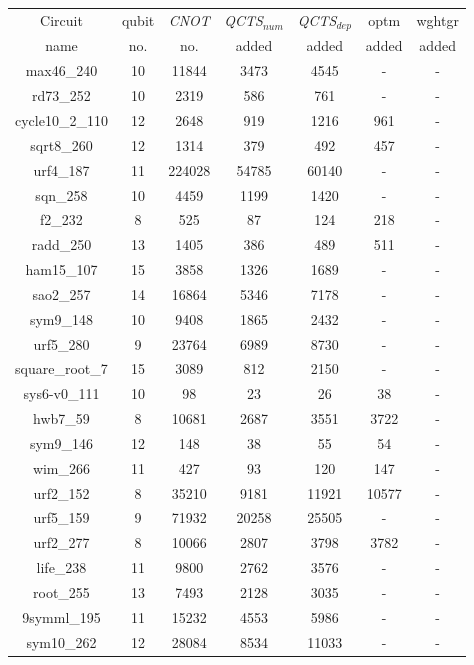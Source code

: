 \documentclass[runningheads]{llncs}
\begin{document}
		\begin{table}[H]
			\label{tab4}
			\begin{center}  
			\begin{tabular}{|c|c|c|c|c|c|c|}
			\hline
			Circuit &  qubit  & \textit{CNOT} &\textit{QCTS$_{num}$}& \textit{QCTS$_{dep}$}  & optm 	 & wghtgr 	\\
			 name	&   no. 	&	no. & added&  added &  added 	&  added\\
			\hline
			max46\_240 & 10 & 11844 & 3473 & 4545 & - & - \\ 
rd73\_252 & 10 & 2319 & 586 & 761 & - & - \\ 
cycle10\_2\_110 & 12 & 2648 & 919 & 1216 & 961 & - \\ 
sqrt8\_260 & 12 & 1314 & 379 & 492 & 457 & - \\ 
urf4\_187 & 11 & 224028 & 54785 & 60140 & - & - \\ 
sqn\_258 & 10 & 4459 & 1199 & 1420 & - & - \\ 
f2\_232 & 8 & 525 & 87 & 124 & 218 & - \\ 
radd\_250 & 13 & 1405 & 386 & 489 & 511 & - \\ 
ham15\_107 & 15 & 3858 & 1326 & 1689 & - & - \\ 
sao2\_257 & 14 & 16864 & 5346 & 7178 & - & - \\ 
sym9\_148 & 10 & 9408 & 1865 & 2432 & - & - \\ 
urf5\_280 & 9 & 23764 & 6989 & 8730 & - & - \\ 
square\_root\_7 & 15 & 3089 & 812 & 2150 & - & - \\ 
sys6-v0\_111 & 10 & 98 & 23 & 26 & 38 & - \\ 
hwb7\_59 & 8 & 10681 & 2687 & 3551 & 3722 & - \\ 
sym9\_146 & 12 & 148 & 38 & 55 & 54 & - \\ 
wim\_266 & 11 & 427 & 93 & 120 & 147 & - \\ 
urf2\_152 & 8 & 35210 & 9181 & 11921 & 10577 & - \\ 
urf5\_159 & 9 & 71932 & 20258 & 25505 & - & - \\ 
urf2\_277 & 8 & 10066 & 2807 & 3798 & 3782 & - \\ 
life\_238 & 11 & 9800 & 2762 & 3576 & - & - \\ 
root\_255 & 13 & 7493 & 2128 & 3035 & - & - \\ 
9symml\_195 & 11 & 15232 & 4553 & 5986 & - & - \\ 
sym10\_262 & 12 & 28084 & 8534 & 11033 & - & - \\ 

\end{tabular}
\end{center}
\end{table}
\end{document}
